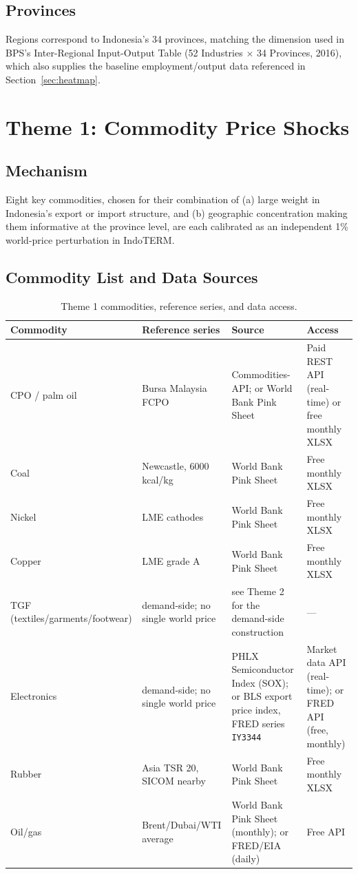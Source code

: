 \documentclass[11pt]{article}
\begin{document}
\subsection{Provinces}

Regions correspond to Indonesia's 34 provinces, matching the dimension used
in BPS's Inter-Regional Input-Output Table (52 Industries $\times$ 34
Provinces, 2016), which also supplies the baseline employment/output data
referenced in Section~\ref{sec:heatmap}.

\section{Theme 1: Commodity Price Shocks}
\label{sec:theme1}

\subsection{Mechanism}

Eight key commodities, chosen for their combination of (a) large weight in
Indonesia's export or import structure, and (b) geographic concentration
making them informative at the province level, are each calibrated as an
independent 1\% world-price perturbation in IndoTERM.

\subsection{Commodity List and Data Sources}

\begin{longtable}{@{}p{2.3cm}p{3.6cm}p{4cm}p{3.5cm}@{}}
\caption{Theme 1 commodities, reference series, and data access.}
\label{tab:theme1-sources} \\
\toprule
Commodity & Reference series & Source & Access \\
\midrule
\endhead
CPO / palm oil & Bursa Malaysia FCPO & Commodities-API; or World Bank Pink
  Sheet & Paid REST API (real-time) or free monthly XLSX \\
Coal & Newcastle, 6000 kcal/kg & World Bank Pink Sheet & Free monthly XLSX \\
Nickel & LME cathodes & World Bank Pink Sheet & Free monthly XLSX \\
Copper & LME grade A & World Bank Pink Sheet & Free monthly XLSX \\
TGF (textiles/garments/footwear) & demand-side; no single world price &
  see Theme 2 for the demand-side construction & --- \\
Electronics & demand-side; no single world price & PHLX Semiconductor Index
  (SOX); or BLS export price index, FRED series \texttt{IY3344} & Market
  data API (real-time); or FRED API (free, monthly) \\
Rubber & Asia TSR 20, SICOM nearby & World Bank Pink Sheet & Free monthly
  XLSX \\
Oil/gas & Brent/Dubai/WTI average & World Bank Pink Sheet (monthly); or
  FRED/EIA (daily) & Free API \\
\bottomrule
\end{longtable}
\end{document}
